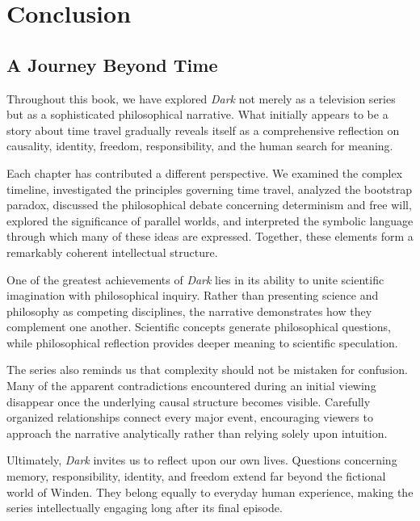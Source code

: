 \documentclass[12pt,oneside,openany]{book}
\begin{document}
\chapter{Conclusion}
\section{A Journey Beyond Time}

Throughout this book, we have explored \textit{Dark} not merely as a television
series but as a sophisticated philosophical narrative. What initially appears
to be a story about time travel gradually reveals itself as a comprehensive
reflection on causality, identity, freedom, responsibility, and the human
search for meaning.

Each chapter has contributed a different perspective. We examined the complex
timeline, investigated the principles governing time travel, analyzed the
bootstrap paradox, discussed the philosophical debate concerning determinism
and free will, explored the significance of parallel worlds, and interpreted
the symbolic language through which many of these ideas are expressed. Together,
these elements form a remarkably coherent intellectual structure.

One of the greatest achievements of \textit{Dark} lies in its ability to unite
scientific imagination with philosophical inquiry. Rather than presenting
science and philosophy as competing disciplines, the narrative demonstrates how
they complement one another. Scientific concepts generate philosophical
questions, while philosophical reflection provides deeper meaning to scientific
speculation.

The series also reminds us that complexity should not be mistaken for
confusion. Many of the apparent contradictions encountered during an initial
viewing disappear once the underlying causal structure becomes visible.
Carefully organized relationships connect every major event, encouraging
viewers to approach the narrative analytically rather than relying solely upon
intuition.

Ultimately, \textit{Dark} invites us to reflect upon our own lives. Questions
concerning memory, responsibility, identity, and freedom extend far beyond the
fictional world of Winden. They belong equally to everyday human experience,
making the series intellectually engaging long after its final episode.
\end{document}
